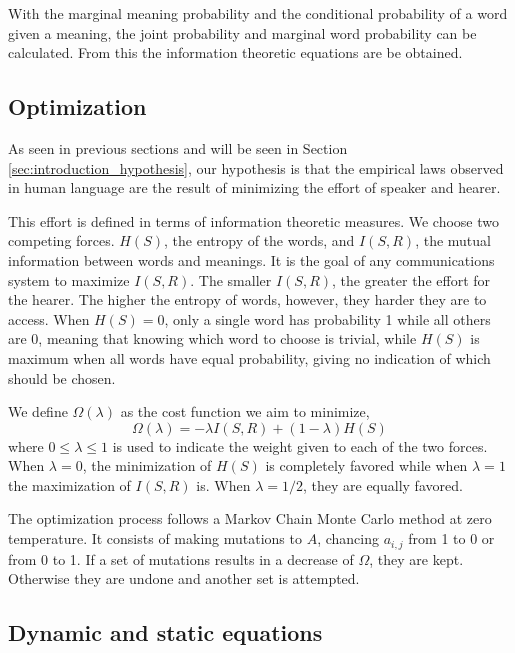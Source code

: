 With the marginal meaning probability and the conditional probability of a word given a meaning, the joint probability and marginal word probability can be calculated.
From this the information theoretic equations are be obtained.

\subsection{Optimization}
\label{sec:introduction_model_optimization}

As seen in previous sections and will be seen in Section \ref{sec:introduction_hypothesis}, our hypothesis is that the empirical laws observed in human language are the result of minimizing the effort of speaker and hearer.

This effort is defined in terms of information theoretic measures.
We choose two competing forces.
$H(S)$, the entropy of the words, and $I(S,R)$, the mutual information between words and meanings.
It is the goal of any communications system to maximize $I(S,R)$. The smaller $I(S,R)$, the greater the effort for the hearer.
The higher the entropy of words, however, they harder they are to access.
When $H(S)=0$, only a single word has probability 1 while all others are 0, meaning that knowing which word to choose is trivial, while $H(S)$ is maximum when all words have equal probability, giving no indication of which should be chosen.

We define $\Omega(\lambda)$ as the cost function we aim to minimize,
\begin{equation}
  \label{eq:definition-Omega}
  \Omega(\lambda) = -\lambda I(S,R) + (1 - \lambda) H(S)
\end{equation}
where $0 \leq \lambda \leq 1$ is used to indicate the weight given to each of the two forces.
When $\lambda=0$, the minimization of $H(S)$ is completely favored while when $\lambda=1$ the maximization of $I(S,R)$ is.
When $\lambda=1/2$, they are equally favored.

The optimization process follows a Markov Chain Monte Carlo method at zero temperature.
It consists of making mutations to $A$, chancing $a_{i,j}$ from 1 to 0 or from 0 to 1.
If a set of mutations results in a decrease of $\Omega$, they are kept.
Otherwise they are undone and another set is attempted.

\subsection{Dynamic and static equations}
\label{sec:introduction_model_dynamic-static}

